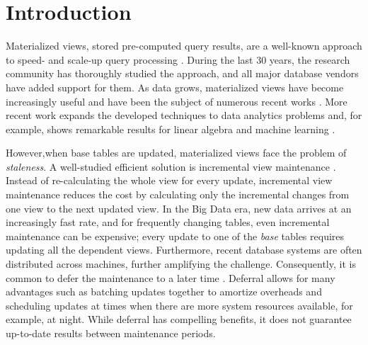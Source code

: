 \section{Introduction}
Materialized views, stored pre-computed query results, are a well-known approach to speed- and scale-up query processing \cite{LarsonY85, gupta1995maintenance, chirkova2011materialized, halevy2001answering}.
During the last 30 years, the research community has thoroughly studied the approach, and all major database vendors have added support for them. 
As data grows, materialized views have become increasingly useful and have been the subject of numerous recent works \cite{lefevre2014opportunistic, bailis2014scalable, perez2014history}.
More recent work expands the developed techniques to data analytics problems and, for example, shows remarkable results for linear algebra and machine learning \cite{nikolic2014linview, zhang2014mat}.

However,when base tables are updated, materialized views face the problem of \emph{staleness}. 
A well-studied efficient solution is incremental view maintenance \cite{gupta1995maintenance, chirkova2011materialized}.
Instead of re-calculating the whole view for every update, incremental view maintenance reduces the cost by calculating only the incremental changes from one view to the next updated view. 
In the Big Data era, new data arrives at an increasingly fast rate, and for frequently changing tables, even incremental maintenance can be expensive; every update to one of the {\em base} tables requires updating all the dependent views. 
Furthermore, recent database systems are often distributed across machines, further amplifying the challenge. 
Consequently, it is common to defer the maintenance to a later time \cite{chirkova2011materialized, zhou2007lazy}.
Deferral allows for many advantages such as batching updates together to amortize overheads and scheduling updates at times when there are more system resources available, for example, at night.
While deferral has compelling benefits, it does not guarantee up-to-date results between maintenance periods. 

